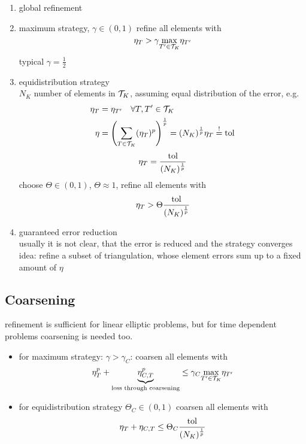 \begin{enumerate}[label=\alph*)]
	\item global refinement
	\item maximum strategy, $\gamma \in(0,1)$ refine all elements with 
	\begin{equation*}
		\eta_T > \gamma \underset{T'\in\mathcal{T}_K}{\max} \eta_{T'}
	\end{equation*}
	typical $\gamma=\frac{1}{2}$ 
	\item equidistribution strategy\\
	$N_K$ number of elements in $\mathcal{T}_K$, assuming equal distribution of the error, e.g.
	\begin{align*}
		\eta_T &= \eta_{T'} \quad \forall T,T' \in \mathcal{T}_K\\
		\eta &= \left(\displaystyle \sum_{T \in \mathcal{T}_K} (\eta_T)^p \right)^{\frac{1}{p}} = (N_K)^{\frac{1}{p}} \eta_T \overset{!}{=} \text{tol}
	\end{align*}
	\begin{equation*}
		\eta_T = \frac{\text{tol}}{(N_K)^\frac{1}{p}}
	\end{equation*}
	choose $\Theta \in (0,1)$, $\Theta \approx1 $, refine all elements with 
	\begin{equation*}
		\eta_T > \Theta \frac{\text{tol}}{(N_K)^\frac{1}{p}}
	\end{equation*}
	
	\item guaranteed error reduction\\
	usually it is not clear, that the error is reduced and the strategy converges\\
	idea: refine a subset of triangulation, whose element errors sum up to a fixed amount of $\eta$
\end{enumerate}

\subsection{Coarsening}
refinement is sufficient for linear elliptic problems, but for time dependent problems coarsening is needed too.
\begin{itemize}
	\item for maximum strategy: $\gamma > \gamma_C$: coarsen all elements with
	\begin{equation*}
		\eta_T^p + \underbrace{\eta_{C,T}^p}_{\text{loss through coarsening}} \leq \gamma_C \underset{T'\in\mathcal{T}_K}{\max} \eta_{T'}
	\end{equation*}
	\item for equidistribution strategy $\Theta_C \in(0,1)$ coarsen all elements with 
	\begin{equation*}
		\eta_T + \eta_{C,T} \leq \Theta_C \frac{\text{tol}}{(N_K)^\frac{1}{p}}
	\end{equation*}
\end{itemize}

